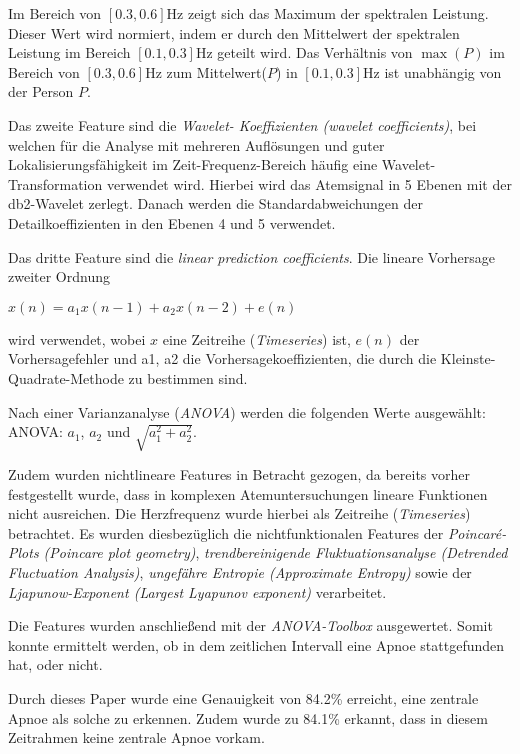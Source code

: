 Im Bereich von $[0.3,0.6]\si{\hertz}$ zeigt sich das Maximum der spektralen Leistung.
Dieser Wert wird normiert, indem er durch den Mittelwert der spektralen Leistung im Bereich $[0.1,0.3]\si{\hertz}$ geteilt wird. 
Das Verhältnis von $\max(P)$ im Bereich von $[0.3,0.6]\si{\hertz}$ zum Mittelwert($P$) in $[0.1,0.3]\si{\hertz}$ ist unabhängig von der Person $P$.

Das zweite Feature sind die \textit{Wavelet- Koeffizienten (wavelet coefficients)}, bei welchen für die Analyse mit mehreren Auflösungen und guter Lokalisierungsfähigkeit im Zeit-Frequenz-Bereich häufig eine Wavelet-Transformation verwendet wird. 
Hierbei wird das Atemsignal in 5 Ebenen mit der db2-Wavelet zerlegt. Danach werden die Standardabweichungen der Detailkoeffizienten in den Ebenen 4 und 5 verwendet. 

Das dritte Feature sind die \textit{linear prediction coefficients}. 
Die lineare Vorhersage zweiter Ordnung
\begin{center}
    $x(n) = a_1 x(n-1) + a_2 x(n-2) + e(n)$
\end{center} 
wird verwendet, wobei $x$ eine Zeitreihe (\textit{Timeseries}) ist, $e(n)$ der Vorhersagefehler und {a1, a2} die Vorhersagekoeffizienten, die durch die Kleinste-Quadrate-Methode zu bestimmen sind.

Nach einer Varianzanalyse (\textit{ANOVA}) werden die folgenden Werte ausgewählt: \\
ANOVA: $a_1$, $a_2$ und $\sqrt{a_1^{2} + a_2^{2}}$.


Zudem wurden nichtlineare Features in Betracht gezogen, da bereits vorher festgestellt wurde, dass in komplexen Atemuntersuchungen lineare Funktionen nicht ausreichen. Die Herzfrequenz wurde hierbei als Zeitreihe (\textit{Timeseries}) betrachtet.
Es wurden diesbezüglich die nichtfunktionalen Features der \textit{Poincaré-Plots (Poincare plot geometry)}, \textit{trendbereinigende Fluktuationsanalyse (Detrended Fluctuation Analysis)}, \textit{ungefähre Entropie (Approximate Entropy)} sowie der \textit{Ljapunow-Exponent (Largest Lyapunov exponent)} verarbeitet. 

Die Features wurden anschließend mit der \textit{ANOVA-Toolbox} ausgewertet.
Somit konnte ermittelt werden, ob in dem zeitlichen Intervall eine Apnoe stattgefunden hat, oder nicht.

Durch dieses Paper wurde eine Genauigkeit von 84.2\% erreicht, eine zentrale Apnoe als solche zu erkennen.
Zudem wurde zu 84.1\% erkannt, dass in diesem Zeitrahmen keine zentrale Apnoe vorkam.



